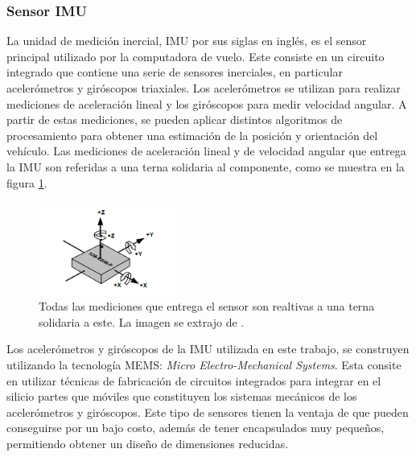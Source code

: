 





\subsubsection{Sensor IMU}\label{sec:IMU}

La unidad de medición inercial, IMU por sus siglas en inglés, es el sensor principal utilizado por la computadora de vuelo. Este consiste en un circuito integrado que contiene una serie de sensores inerciales, en particular acelerómetros y giróscopos triaxiales. Los acelerómetros se utilizan para realizar mediciones de aceleración lineal y los giróscopos para medir velocidad angular. A partir de estas mediciones, se pueden aplicar distintos algoritmos de procesamiento para obtener una estimación de la posición y orientación del vehículo. Las mediciones de aceleración lineal y de velocidad angular que entrega la IMU son referidas a una terna solidaria al componente, como se muestra en la figura \ref{fig:IMU_ejes}.

\begin{figure}[htb]
    \centering
    \includegraphics[width=0.4\textwidth]{img/IMU_ejes.png}
    \caption{Todas las mediciones que entrega el sensor son realtivas a una terna solidaria a este. La imagen se extrajo de \cite{ICM42688pDatasheet}.}
    \label{fig:IMU_ejes}
\end{figure}

Los acelerómetros y giróscopos de la IMU utilizada en este trabajo, se construyen utilizando la tecnología MEMS: \textit{Micro Electro-Mechanical Systems}. Esta consite en utilizar técnicas de fabricación de circuitos integrados para integrar en el silicio partes que móviles que constituyen los sistemas mecánicos de los acelerómetros y giróscopos. Este tipo de sensores tienen la ventaja de que pueden conseguirse por un bajo costo, además de tener encapsulados muy pequeños, permitiendo obtener un diseño de dimensiones reducidas. 


